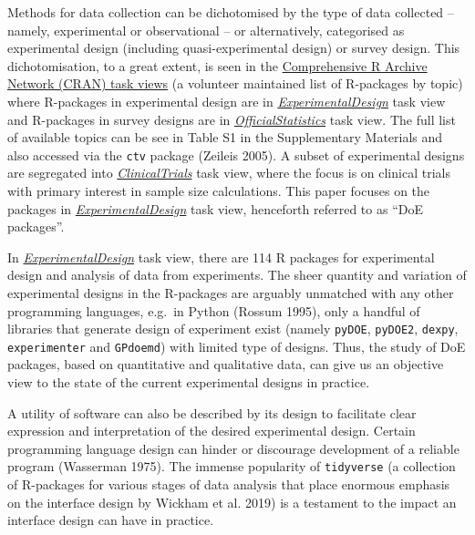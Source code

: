 \documentclass{article}
\begin{document}
Methods for data collection can be dichotomised by the type of data
collected -- namely, experimental or observational -- or alternatively,
categorised as experimental design (including quasi-experimental design)
or survey design. This dichotomisation, to a great extent, is seen in
the \href{https://cran.r-project.org/web/views/}{Comprehensive R Archive
Network (CRAN) task views} (a volunteer maintained list of R-packages by
topic) where R-packages in experimental design are in
\href{http://CRAN.R-project.org/view=ExperimentalDesign}{\emph{ExperimentalDesign}}
task view and R-packages in survey designs are in
\href{http://CRAN.R-project.org/view=OfficialStatistics}{\emph{OfficialStatistics}}
task view. The full list of available topics can be see in Table S1 in
the Supplementary Materials and also accessed via the \texttt{ctv}
package (Zeileis 2005). A subset of experimental designs are segregated
into
\href{http://CRAN.R-project.org/view=ClinicalTrials}{\emph{ClinicalTrials}}
task view, where the focus is on clinical trials with primary interest
in sample size calculations. This paper focuses on the packages in
\href{http://CRAN.R-project.org/view=ExperimentalDesign}{\emph{ExperimentalDesign}}
task view, henceforth referred to as ``DoE packages''.

In
\href{http://CRAN.R-project.org/view=ExperimentalDesign}{\emph{ExperimentalDesign}}
task view, there are 114 R packages for experimental design and analysis
of data from experiments. The sheer quantity and variation of
experimental designs in the R-packages are arguably unmatched with any
other programming languages, e.g.~in Python (Rossum 1995), only a
handful of libraries that generate design of experiment exist (namely
\texttt{pyDOE}, \texttt{pyDOE2}, \texttt{dexpy}, \texttt{experimenter}
and \texttt{GPdoemd}) with limited type of designs. Thus, the study of
DoE packages, based on quantitative and qualitative data, can give us an
objective view to the state of the current experimental designs in
practice.

A utility of software can also be described by its design to facilitate
clear expression and interpretation of the desired experimental design.
Certain programming language design can hinder or discourage development
of a reliable program (Wasserman 1975). The immense popularity of
\texttt{tidyverse} (a collection of R-packages for various stages of
data analysis that place enormous emphasis on the interface design by
Wickham et al. 2019) is a testament to the impact an interface design
can have in practice.
\end{document}
